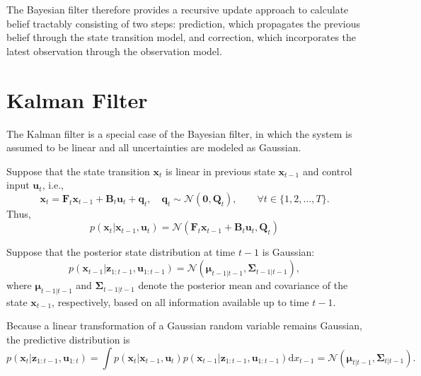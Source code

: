 \documentclass[../Bayesian_Inference.tex]{subfiles}
\begin{document}
The Bayesian filter therefore provides a recursive update approach to calculate belief tractably consisting of two steps: prediction, which propagates the previous belief through the state transition model, and correction, which incorporates the latest observation through the observation model.


\section{Kalman Filter}

The Kalman filter is a special case of the Bayesian filter, in which the system is assumed to be linear and all uncertainties are modeled as Gaussian.

Suppose that the state transition $\bm{x}_t$ is linear in previous state $\bm{x}_{t-1}$ and control input $\bm{u}_t$, i.e.,
\[
    \bm{x}_t = \mathbf{F}_{t} \bm{x}_{t-1} + \mathbf{B}_{t} \bm{u}_{t} + \bm{q}_t, \quad \bm{q}_t \sim \mathcal{N}(\bm{0}, \mathbf{Q}_t), \qquad \forall t \in \{1, 2, \dots, T\}.
\]
Thus,
\[
    p(\bm{x}_t | \bm{x}_{t-1}, \bm{u}_{t}) = \mathcal{N}(\mathbf{F}_{t} \bm{x}_{t-1} + \mathbf{B}_{t} \bm{u}_{t}, \mathbf{Q}_t)
\]

Suppose that the posterior state distribution at time $t-1$ is Gaussian:
\[
    p(\bm{x}_{t-1} | \bm{z}_{1:t-1}, \bm{u}_{1:t-1}) = \mathcal{N}(\bm{\mu}_{t-1 | t-1}, \mathbf{\Sigma}_{t-1 | t-1}),
\]
where $\bm{\mu}_{t-1 | t-1}$ and $\mathbf{\Sigma}_{t-1 | t-1}$ denote the posterior mean and covariance of the state $\bm{x}_{t-1}$, respectively, based on all information available up to time $t-1$.

Because a linear transformation of a Gaussian random variable remains Gaussian, the predictive distribution is
\[
    p(\bm{x}_{t} | \bm{z}_{1:t-1}, \bm{u}_{1:t}) = \int p(\bm{x}_t  | \bm{x}_{t-1}, \bm{u}_t) p (\bm{x}_{t-1} | \bm{z}_{1:t-1}, \bm{u}_{1:t-1}) \mathrm{d} x_{t-1} = \mathcal{N}(\bm{\mu}_{t | t-1}, \mathbf{\Sigma}_{t | t-1}).
\]
\end{document}
